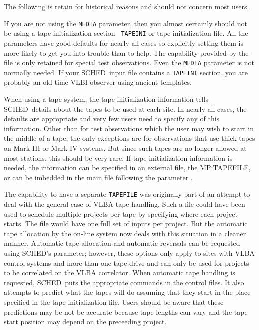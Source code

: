 \documentclass{report}
\newcommand{\sched}{{\sc SCHED}}
\newcommand{\schedb}{{\sc SCHED~}}
\begin{document}
The following is retain for historical reasons and should not concern
most users.

If you are not using the {\tt MEDIA} parameter, then you almost
certainly should not be using a tape initialization section {\tt
TAPEINI} or tape initialization file.  All the parameters have good
defaults for nearly all cases so explicitly setting them is more
likely to get you into trouble than to help.  The capability provided
by the file is only retained for special test observations.  Even the
{\tt MEDIA} parameter is not normally needed.  If your \schedb input
file contains a {\tt TAPEINI} section, you are probably an old time
VLBI observer using ancient templates.

When using a tape system, the tape initialization information tells
\schedb details about the tapes to be used at each site.  In nearly
all cases, the defaults are appropriate and very few users need to
specify any of this information.  Other than for test observations
which the user may wish to start in the middle of a tape, the only
exceptions are for observations that use thick tapes on Mark III or
Mark IV systems.  But since such tapes are no longer allowed at most
stations, this should be very rare.  If tape initialization
information is needed, the information can be specified in an external
file, the  {MP:TAPEFILE}, or can be imbedded
in the main file following the parameter .

The capability to have a separate {\tt TAPEFILE} was originally part
of an attempt to deal with the general case of VLBA tape handling.
Such a file could have been used to schedule multiple projects per
tape by specifying where each project starts.  The file would have one
full set of inputs per project.  But the automatic tape allocation by
the on-line system now deals with this situation in a cleaner manner.
Automatic tape allocation and automatic reversals can be requested
using \sched's  parameter;
however, these options only apply to sites with VLBA control systems
and more than one tape drive and can only be used for projects to be
correlated on the VLBA correlator.  When automatic tape handling is
requested, \schedb puts the appropriate commands in the control files.
It also attempts to predict what the tapes will do assuming that they
start in the place specified in the tape initialization file.  Users
should be aware that these predictions may be not be accurate because
tape lengths can vary and the tape start position may depend on the
preceeding project.
\end{document}
